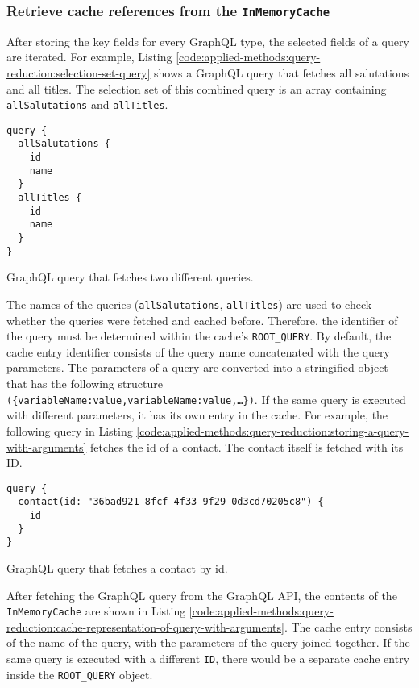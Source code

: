 \subsubsection{Retrieve cache references from the \texttt{InMemoryCache}}

After storing the key fields for every GraphQL type, the selected fields of a query are iterated. For example, Listing \ref{code:applied-methods:query-reduction:selection-set-query} shows a GraphQL query that fetches all salutations and all titles. The selection set of this combined query is an array containing \texttt{allSalutations} and \texttt{allTitles}.

\ifshowListings
\begin{listing}[H]
  \begin{verbatim}
query {
  allSalutations {
    id
    name
  }
  allTitles {
    id
    name
  }
}
  \end{verbatim}
  \caption{GraphQL query that fetches two different queries.}\label{code:applied-methods:query-reduction:selection-set-query}
\end{listing}
\fi

\noindent The names of the queries (\texttt{allSalutations}, \texttt{allTitles}) are used to check whether the queries were fetched and cached before. Therefore, the identifier of the query must be determined within the cache's \texttt{ROOT\_QUERY}. By default, the cache entry identifier consists of the query name concatenated with the query parameters. The parameters of a query are converted into a stringified object that has the following structure \texttt{(\{variableName:value,variableName:value,\dots\})}. If the same query is executed with different parameters, it has its own entry in the cache. For example, the following query in Listing \ref{code:applied-methods:query-reduction:storing-a-query-with-arguments} fetches the id of a contact. The contact itself is fetched with its \ac{ID}.

\ifshowListings
\begin{listing}[H]
\begin{verbatim}
query {
  contact(id: "36bad921-8fcf-4f33-9f29-0d3cd70205c8") {
    id
  }
}
\end{verbatim}
\caption{GraphQL query that fetches a contact by id.}\label{code:applied-methods:query-reduction:storing-a-query-with-arguments}
\end{listing}
\fi

\noindent After fetching the GraphQL query from the GraphQL \ac{API}, the contents of the \texttt{InMemoryCache} are shown in Listing \ref{code:applied-methods:query-reduction:cache-representation-of-query-with-arguments}. The cache entry consists of the name of the query, with the parameters of the query joined together. If the same query is executed with a different \texttt{ID}, there would be a separate cache entry inside the \texttt{ROOT\_QUERY} object.

